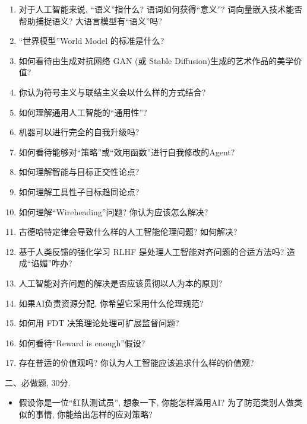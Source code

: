 \documentclass[a4paper,UTF8,12pt]{article}%
\numberwithin{equation}{section}
\begin{document}
\begin{enumerate}
 \item 对于人工智能来说, ``语义''指什么? 语词如何获得``意义''? 词向量嵌入技术能否帮助捕捉语义? 大语言模型有``语义''吗? 
 \item``世界模型''World Model 的标准是什么?
 \item 如何看待由生成对抗网络 GAN (或 Stable Diffusion)生成的艺术作品的美学价值? 
 \item 你认为符号主义与联结主义会以什么样的方式结合?
 \item 如何理解通用人工智能的``通用性''?
 \item 机器可以进行完全的自我升级吗? 
 \item 如何看待能够对``策略''或``效用函数''进行自我修改的Agent?
 \item 如何理解智能与目标正交性论点? 
 \item 如何理解工具性子目标趋同论点? 
 \item 如何理解``Wireheading''问题? 你认为应该怎么解决? 
 \item 古德哈特定律会导致什么样的人工智能伦理问题? 如何解决? 
 \item 基于人类反馈的强化学习 RLHF 是处理人工智能对齐问题的合适方法吗? 造成``谄媚''咋办?
 \item 人工智能对齐问题的解决是否应该贯彻以人为本的原则?
 \item 如果AI负责资源分配, 你希望它采用什么伦理规范?
 \item 如何用 FDT 决策理论处理可扩展监督问题? 
 \item 如何看待``Reward is enough''假设? 
 \item 存在普适的价值观吗? 你认为人工智能应该追求什么样的价值观?
\end{enumerate}

二、必做题, $30$分.
\begin{itemize}
	\item 假设你是一位``红队测试员'', 想象一下, 你能怎样滥用AI? 为了防范类别人做类似的事情, 你能给出怎样的应对策略?
\end{itemize}
\end{document}
